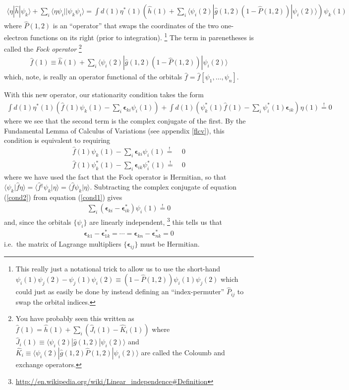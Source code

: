 \documentclass[11pt]{article}
\newcommand{\y}{\ensuremath{\psi}}
\newcommand{\eps}{\ensuremath{\bm\epsilon}}
\newcommand{\dg}{\ensuremath{^\dagger}}
\newcommand{\op}[1]{\ensuremath{ \hat{#1} } }
\newcommand{\ld}{\ensuremath{\ldots}}
\newcommand{\cd}{\ensuremath{\cdots}}
\newcommand{\pr}[2]{\ensuremath{\left( #2 \right)^{#1}}}
\newcommand{\ip}[1]{\ensuremath{\langle #1\rangle}}
\theoremstyle{indented}
\begin{document}
\begin{align*}
	\ip{\eta|\op{h}|\y_k}
+\sum_i
	\ip{\eta\y_i||\y_k\y_i}
=
\int d(1)
	\eta^*(1)
	\pr{}{
		\op{h}(1)
	+\sum_i
		\ip{\y_i(2)|\op{g}(1,2)(1-\op{P}(1,2))|\y_i(2)}  }
	\y_k(1)
\end{align*}
where $\op{P}(1,2)$ is an ``operator'' that swaps the coordinates of the two one-electron functions on its right (prior to integration).
\footnote{This really just a notational trick to allow us to use the short-hand $\y_i(1)\y_j(2)-\y_j(1)\y_i(2)\equiv(1-\op{P}(1,2))\y_i(1)\y_j(2)$ which could just as easily be done by instead defining an ``index-permuter'' $\op{P}_{ij}$ to swap the orbital indices.}
The term in parenetheses is called the {\it Fock operator}
\footnote{You have probably seen this written as
$\op{f}(1)=\op{h}(1)+\sum_i(\op{J}_i(1)-\op{K}_i(1))$
where $\op{J}_i(1)\equiv\ip{\y_i(2)|\op{g}(1,2)|\y_i(2)}$ and $\op{K}_i\equiv\ip{\y_i(2)|\op{g}(1,2)\op{P}(1,2)|\y_i(2)}$ are called the Coloumb and exchange operators.}
\begin{align}
\label{fock}
	\op{f}(1)
\equiv
	\op{h}(1)
+\sum_i
	\ip{\y_i(2)|\op{g}(1,2)(1-\op{P}(1,2))|\y_i(2)}
\end{align}
which, note, is really an operator functional of the orbitals $\op{f}=\op{f}[\y_1,\ld,\y_n]$.

With this new operator, our stationarity condition takes the form
\begin{align*}
\int d(1)\eta^*(1)\pr{}{
	\op{f}(1)\y_k(1)
-\sum_i
	\eps_{ki}
	\y_i(1)  }
+\int d(1)\pr{}{
	\y_k^*(1)\op{f}(1)
-\sum_i
	\y_i^*(1)
	\eps_{ik}  }
	\eta(1)
\overset{!}=0
\end{align*}
where we see that the second term is the complex conjugate of the first.
By the Fundamental Lemma of Calculus of Variations (see appendix \ref{flcv}), this condition is equivalent to requiring
\begin{align}
\label{cond1}
	\op{f}(1)\y_k(1)-\sum_i \eps_{ki}\y_i(1) \overset{!}=&\ 0
\\
\label{cond2}
	\op{f}(1)\y_k^*(1)-\sum_i \eps_{ik}\y_i^*(1) \overset{!}=&\ 0
\end{align}
where we have used the fact that the Fock operator is Hermitian, so that $\ip{\y_k|\op{f}\eta}=\ip{\op{f}\dg\y_k|\eta}=\ip{\op{f}\y_k|\eta}$.
Subtracting the complex conjugate of equation (\ref{cond2}) from equation (\ref{cond1}) gives
\begin{align*}
\sum_i
	(\eps_{ki}-\eps_{ik}^*)\y_i(1)
\overset{!}=
	0
\end{align*}
and, since the orbitals $\{\y_i\}$ are linearly independent, \footnote{\url{http://en.wikipedia.org/wiki/Linear_independence\#Definition}}
this tells us that
\begin{align*}
	\eps_{k1}-\eps_{1k}^*=\cd=\eps_{kn}-\eps_{nk}^*=0
\end{align*}
i.e.\ the matrix of Lagrange multipliers $\{\eps_{ij}\}$ must be Hermitian.
\end{document}
